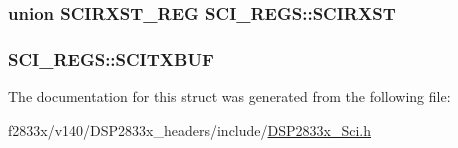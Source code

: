 \subsubsection[{S\+C\+I\+R\+X\+S\+T}]{\setlength{\rightskip}{0pt plus 5cm}union {\bf S\+C\+I\+R\+X\+S\+T\+\_\+\+R\+E\+G} S\+C\+I\+\_\+\+R\+E\+G\+S\+::\+S\+C\+I\+R\+X\+S\+T}\label{struct_s_c_i___r_e_g_s_a1e4af82f9810bbdfa98a24399167499f}
\hypertarget{struct_s_c_i___r_e_g_s_a1830faf4f46a7ac90a15fdde0b809175}{}
\subsubsection[{S\+C\+I\+T\+X\+B\+U\+F}]{ S\+C\+I\+\_\+\+R\+E\+G\+S\+::\+S\+C\+I\+T\+X\+B\+U\+F}\label{struct_s_c_i___r_e_g_s_a1830faf4f46a7ac90a15fdde0b809175}


The documentation for this struct was generated from the following file\+:\begin{DoxyCompactItemize}
\item 
f2833x/v140/\+D\+S\+P2833x\+\_\+headers/include/\hyperlink{_d_s_p2833x___sci_8h}{D\+S\+P2833x\+\_\+\+Sci.\+h}\end{DoxyCompactItemize}
